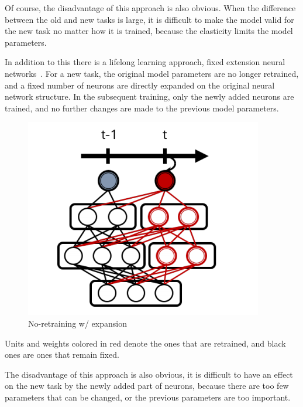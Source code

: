 Of course, the disadvantage of this approach is also obvious. When the difference between the old and new tasks is large, it is difficult to make the model valid for the new task no matter how it is trained, because the elasticity limits the model parameters.

In addition to this there is a lifelong learning approach, fixed extension neural networks~\cite{rusu2016progressive}. For a new task, the original model parameters are no longer retrained, and a fixed number of neurons are directly expanded on the original neural network structure. In the subsequent training, only the newly added neurons are trained, and no further changes are made to the previous model parameters.
\begin{figure}[H]
	\centering
	\includegraphics[width=1\linewidth]{figures_ning/no-train}
	\caption[No-retraining w/ expansion]{No-retraining w/ expansion}
	\label{fig:no-train}
\end{figure}
Units and weights colored in red denote the ones that are retrained, and black ones are ones that remain
fixed.

The disadvantage of this approach is also obvious, it is difficult to have an effect on the new task by the newly added part of neurons, because there are too few parameters that can be changed, or the previous parameters are too important.

